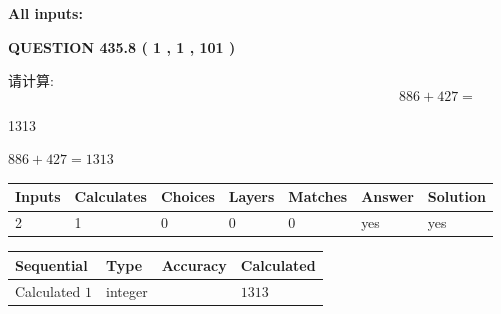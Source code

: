 \documentclass{ctexart}
\begin{document}
   
   
   
\noindent\vspace{0.1in}\hspace{-0.08in} {\textbf{\Large{All inputs: }}}
   
   
  
\vspace{0.2in}
  
{\textbf{\Large{QUESTION
435.8 
 ( 1 , 1 , 101 )
}}}
  
  
 
请计算:
\begin{equation}
886 +  %
427 = \nonumber
\end{equation}
 
 
 
\noindent{}
 
 

1313
 
 
\noindent{}
 
 

 
 
 
\noindent{}
 
 

$ %
886 +  %
427=   %
1313$
 
 
\noindent{}
 
 

 
   
   
   
   
\noindent\begin{tabular}{|l|l|l|l|l|l|l|}
 \hline
Inputs & Calculates & Choices & Layers & Matches & Answer & Solution \\ \hline
 2  & 
 1  & 
 0
  & 
 0  & 
 0  & 
  yes & 
  yes 
  \\ \hline
 \end{tabular}
   
   
   
   
\noindent{}
   
   
  
  
\noindent\begin{tabular}{|l|l|l|l|}
\hline
 Sequential & Type & Accuracy & Calculated \\ 
\hline
 
 
  Calculated $  1 $ & integer &  & 
  $ 1313 $ 
 \\  \hline  
 \end{tabular}
   
\end{document}
